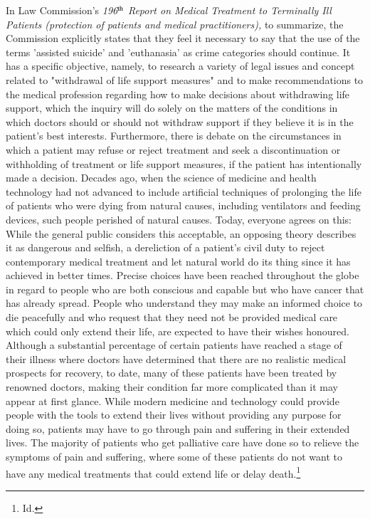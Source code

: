 \begin{multicols}{2}
\vspace{.1cm}

\noi
In Law Commission’s \textit{196$^{\rm th}$ Report on Medical Treatment to Terminally Ill Patients
(protection of patients and medical practitioners),} to summarize, the Commission explicitly
states that they feel it necessary to say that the use of the terms 'assisted suicide' and
'euthanasia' as crime categories should continue. It has a specific objective, namely, to
research a variety of legal issues and concept related to "withdrawal of life support measures"  
and to make recommendations to the medical profession regarding how to make decisions
about withdrawing life support, which the inquiry will do solely on the matters of the
conditions in which doctors should or should not withdraw support if they believe it is in the
patient's best interests. Furthermore, there is debate on the circumstances in which a patient
may refuse or reject treatment and seek a discontinuation or withholding of treatment or life
support measures, if the patient has intentionally made a decision. Decades ago, when the
science of medicine and health technology had not advanced to include artificial techniques
of prolonging the life of patients who were dying from natural causes, including ventilators
and feeding devices, such people perished of natural causes. Today, everyone agrees on this:
While the general public considers this acceptable, an opposing theory describes it as
dangerous and selfish, a dereliction of a patient's civil duty to reject contemporary medical
treatment and let natural world do its thing since it has achieved in better times. Precise
choices have been reached throughout the globe in regard to people who are both conscious
and capable but who have cancer that has already spread. People who understand they may
make an informed choice to die peacefully and who request that they need not be provided
medical care which could only extend their life, are expected to have their wishes honoured.
Although a substantial percentage of certain patients have reached a stage of their illness
where doctors have determined that there are no realistic medical prospects for recovery, to
date, many of these patients have been treated by renowned doctors, making their condition
far more complicated than it may appear at first glance. While modern medicine and
technology could provide people with the tools to extend their lives without providing any
purpose for doing so, patients may have to go through pain and suffering in their extended
lives. The majority of patients who get palliative care have done so to relieve the symptoms
of pain and suffering, where some of these patients do not want to have any medical
treatments that could extend life or delay death.\footnote{ Id.}


\end{multicols}
